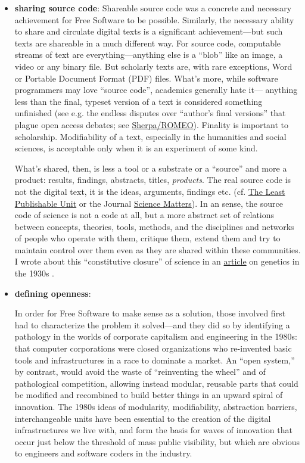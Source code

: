 \documentclass[11pt]{article}
\begin{document}
\begin{itemize}
\item \textbf{sharing source code}:
\label{sec:org86d6301}
Shareable source code was a concrete and necessary achievement for Free Software to be possible.  Similarly, the necessary ability to share and circulate digital texts is a significant achievement---but such texts are shareable in a much different way.  For source code, computable streams of text are everything---anything else is a ``blob'' like an image, a video or any binary file. But scholarly texts are, with rare exceptions, Word or Portable Document Format (PDF) files.   What's more, while software programmers may love ``source code'', academics generally hate it--- anything less than the final, typeset version of a text is considered something unfinished (see e.g. the endless disputes over ``author's final versions'' that plague open access debates; see \href{http://www.sherpa.ac.uk/romeo/index.php}{Sherpa/ROMEO}).  Finality is important to scholarship.  Modifiability of a text, especially in the humanities and social sciences, is acceptable only when it is an experiment of some kind.

What's shared, then, is less a tool or a substrate or a ``source'' and more a product: results, findings, abstracts, titles, \emph{products}.   The real source code is not the digital text, it is the ideas, arguments, findings etc.  (cf. \href{https://en.wikipedia.org/wiki/Least\_publishable\_unit}{The Least Publishable Unit} or the Journal \href{https://www.sciencematters.io/why-matters}{Science Matters}).  In an sense, the source code of science is not a code at all, but a more abstract set of relations between concepts, theories, tools, methods, and the disciplines and networks of people who operate with them, critique them, extend them and try to maintain control over them even as they are shared within these communities.  I wrote about this ``constitutive closure'' of science in an \href{https://kelty.org/or/papers/Kelty-biosoc20128a.pdf}{article} on genetics in the 1930s \cite{kelty2012not}.

\item \textbf{defining openness}:
\label{sec:org78d5965}

In order for Free Software to make sense as a solution, those involved first had to characterize the problem it solved---and they did so by identifying a pathology in the worlds of corporate capitalism and engineering in the 1980s: that computer corporations were closed organizations who re-invented basic tools and infrastructures in a race to dominate a market.    An ``open system,'' by contrast, would avoid the waste of ``reinventing the wheel'' and of pathological competition, allowing instead  modular, reusable parts that could be modified and recombined to build better things in an upward spiral of innovation.  The 1980s ideas of modularity, modifiability, abstraction barriers, interchangeable units have been essential to the creation of the digital infrastructures we live with, and form the basis for waves of innovation that occur just below the threshold of mass public visibility, but which are obvious to engineers and software coders in the industry. 


\end{itemize}
\end{document}
